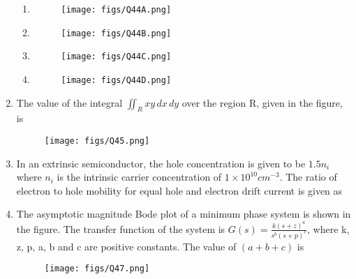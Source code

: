 \documentclass[a4paper, 11pt]{article}
\begin{document}
\begin{enumerate}
    \begin{enumerate}
        \item \begin{figure}[H] \centering \texttt{[image: figs/Q44A.png]} \caption*{} \label{fig:q40a} \end{figure}
        \item \begin{figure}[H] \centering \texttt{[image: figs/Q44B.png]} \caption*{} \label{fig:q40b} \end{figure}
        \item \begin{figure}[H] \centering \texttt{[image: figs/Q44C.png]} \caption*{} \label{fig:q40c} \end{figure}
        \item \begin{figure}[H] \centering \texttt{[image: figs/Q44D.png]} \caption*{} \label{fig:q40d} \end{figure}
    \end{enumerate}
    
    \hfill{}
    
    \item The value of the integral $\iint_R xy \, dx \, dy$ over the region R, given in the figure, is \underline{\hspace{2cm}} \\
    \begin{figure}[H]
        \centering
        \texttt{[image: figs/Q45.png]}
        \caption*{}
        \label{fig:q55}
    \end{figure}
    
    \hfill{}
    
    \item In an extrinsic semiconductor, the hole concentration is given to be $1.5n_i$ where $n_i$ is the intrinsic carrier concentration of $1 \times 10^{10} cm^{-3}$. The ratio of electron to hole mobility for equal hole and electron drift current is given as \underline{\hspace{2cm}} 
    
    \hfill{}
    
    \item The asymptotic magnitude Bode plot of a minimum phase system is shown in the figure. The transfer function of the system is $G(s) = \frac{k(s+z)^a}{s^b(s+p)^c}$, where k, z, p, a, b and c are positive constants. The value of $(a+b+c)$ is \underline{\hspace{2cm}} 
    \begin{figure}[H]
        \centering
        \texttt{[image: figs/Q47.png]}
        \caption*{}
        \label{fig:q57}
    \end{figure}
    

\end{enumerate}
\end{document}
